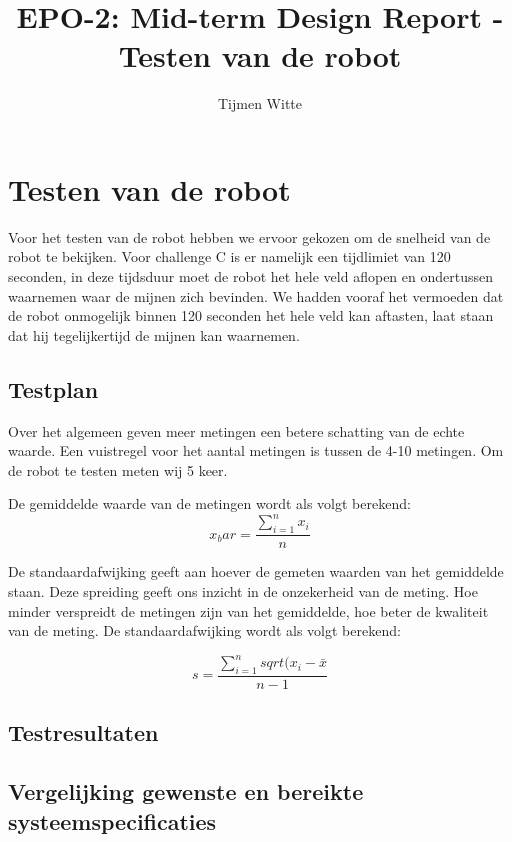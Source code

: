 \documentclass{report}
\title{EPO-2: Mid-term Design Report - Testen van de robot}
\author{Tijmen Witte}
\begin{document}
\chapter{Testen van de robot}

Voor het testen van de robot hebben we ervoor gekozen om de snelheid van de robot te bekijken.
Voor challenge C is er namelijk een tijdlimiet van 120 seconden, in deze tijdsduur moet de robot het hele veld aflopen en ondertussen waarnemen waar de mijnen zich bevinden.
We hadden vooraf het vermoeden dat de robot onmogelijk binnen 120 seconden het hele veld kan aftasten, laat staan dat hij tegelijkertijd de mijnen kan waarnemen. 

\section{Testplan}
Over het algemeen geven meer metingen een betere schatting van de echte waarde. Een vuistregel voor het aantal metingen is tussen de 4-10 metingen. Om de robot te testen meten wij 5 keer. 

De gemiddelde waarde van de metingen wordt als volgt berekend:
\begin{equation}
x_bar=\frac{\sum_{i=1}^{n}x_i}{n}
\end{equation}

De standaardafwijking geeft aan hoever de gemeten waarden van het gemiddelde staan. Deze spreiding geeft ons inzicht in de onzekerheid van de meting. Hoe minder verspreidt de metingen zijn van het gemiddelde, hoe beter de kwaliteit van de meting. De standaardafwijking wordt als volgt berekend:

\begin{equation}
s=\frac{\sum_{i=1}^{n}sqrt{(x_i-\bar{x}}}{n-1}
\end{equation}

\section{Testresultaten}

\section{Vergelijking gewenste en bereikte systeemspecificaties}
\end{document}
